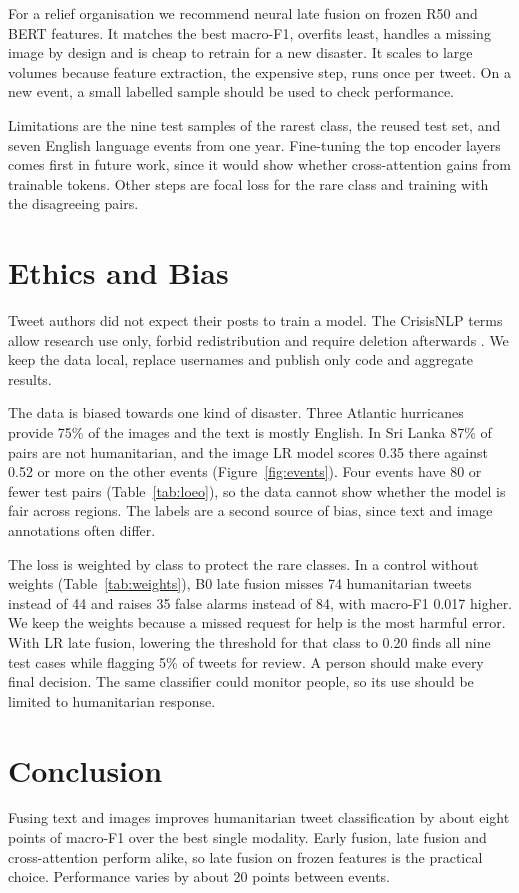 \documentclass[11pt,a4paper]{article}
\begin{document}
For a relief organisation we recommend neural late fusion on frozen R50
and BERT features. It matches the best macro-F1, overfits least, handles a missing image by design and is cheap to retrain for a new disaster. It scales to large volumes because feature extraction, the expensive step, runs once per tweet. On a new event, a small labelled sample should be used to check performance.

Limitations are the nine test samples of the rarest class, the reused
test set, and seven English language events from one year. Fine-tuning the top encoder layers comes first in future work, since it would show whether cross-attention gains from trainable tokens. Other steps are focal loss \citep{Lin2017} for the rare class and training with the disagreeing pairs.

\section{Ethics and Bias}
\label{sec:ethics}
Tweet authors did not expect their posts to train a model. The CrisisNLP
terms allow research use only, forbid redistribution and require deletion
afterwards \citep{CrisisNLPterms}. We keep the data local, replace
usernames and publish only code and aggregate results.

The data is biased towards one kind of disaster. Three Atlantic
hurricanes provide 75\% of the images and the text is mostly English. In
Sri Lanka 87\% of pairs are not humanitarian, and the image LR model scores
0.35 there against 0.52 or more on the other events (Figure~\ref{fig:events}). Four events have 80 or fewer test pairs (Table~\ref{tab:loeo}), so the data cannot show whether the model is fair across regions. The
labels are a second source of bias, since text and image annotations often differ.

The loss is weighted by class to protect the rare classes. In a control without weights (Table~\ref{tab:weights}), B0 late fusion misses 74 humanitarian tweets instead of 44 and raises 35 false alarms instead of 84, with macro-F1 0.017 higher. We keep the weights because a missed request for help is the most harmful error. With LR late fusion, lowering the threshold for that class to 0.20 finds all
nine test cases while flagging 5\% of tweets for review. A person should
make every final decision. The same classifier could monitor people, so
its use should be limited to humanitarian response.

\section{Conclusion}
\label{sec:conclusion}
Fusing text and images improves humanitarian tweet classification by
about eight points of macro-F1 over the best single modality. Early
fusion, late fusion and cross-attention perform alike, so late fusion on
frozen features is the practical choice. Performance varies by about 20 points between events.
\end{document}
